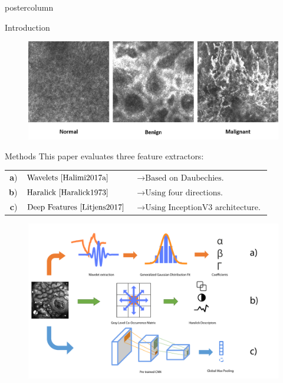 \documentclass[final]{beamer}
\begin{document}
\begin{frame}
\begin{columns}[t]
\begin{column}{.49\textwidth}
\begin{beamercolorbox}[center,wd=\textwidth]{postercolumn}
\begin{minipage}[T]{.95\textwidth}
{\begin{block}{Introduction}
        	    \begin{figure}
                    \includegraphics[width=.9\linewidth]{content/figures/Data.png}
				\end{figure}
            \end{block}   
            \vspace{0.1in}
            \begin{block}{Methods}
                This paper evaluates three feature extractors:
                \hspace*{2.5cm}
                    \begin{tabular*}{0.8\textwidth}{rll}
                          \textbf a) & \(\text{Wavelets \cite{Halimi2017a}}\)  & \(\rightarrow \text{Based on Daubechies.}\) \\
                          \textbf b) & \(\text{Haralick \cite{Haralick1973}}\) & \(\rightarrow \text{Using four directions.}\) \\
                          \textbf c) & \(\text{Deep Features \cite{Litjens2017}}\) & \(\rightarrow \text{Using InceptionV3 architecture.}\) \\
                    \end{tabular*}
				\begin{figure}[h]
                \centering
                  \includegraphics[width=\linewidth]{content/figures/Methods.pdf}

\end{figure}
\end{block}}
\end{minipage}
\end{beamercolorbox}
\end{column}
\end{columns}
\end{frame}
\end{document}
